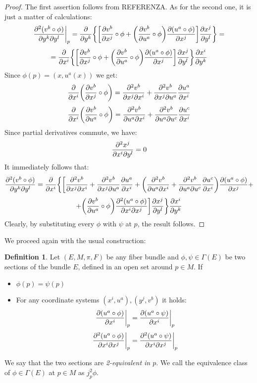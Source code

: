 \documentclass[12pt,a4paper]{report}
\theoremstyle{definition}
\newtheorem{Def}{Definition}[chapter]
\theoremstyle{Theorem}
\theoremstyle{definition}
\theoremstyle{definition}
\begin{document}
	\begin{proof}
		The first assertion follows from REFERENZA. As for the second one, it is just a matter of calculations:
		$${\partial^2(v^b\circ\phi) \over \partial{y^k}\partial{y^l}}\bigg|_p={\partial\over \partial y^k}\bigg\{\bigg[{\partial v^b\over \partial{x^j}}\circ \phi+\bigg({\partial v^b\over \partial{u^a}}\circ \phi\bigg) {\partial(u^a\circ \phi)\over \partial{x^j}}\bigg]{\partial x^j\over  \partial y^l}\bigg\}=$$
		$$={\partial\over \partial x^i}\bigg\{\bigg[{\partial v^b\over \partial{x^j}}\circ \phi+\bigg({\partial v^b\over \partial{u^a}}\circ \phi\bigg) {\partial(u^a\circ \phi)\over \partial{x^j}}\bigg]{\partial x^j\over  \partial y^l}\bigg\}{\partial x^i\over \partial y^k}$$
		Since $\phi(p)=(x,u^a(x))$ we get:
		$${\partial\over \partial x^i}\bigg({\partial v^b\over \partial{x^j}}\circ \phi\bigg)=
		{\partial^2 v^b\over \partial{x^j}\partial x^i}+{\partial^2 v^b\over \partial{x^j}\partial u^a}{\partial u^a\over \partial x^i}$$
		$${\partial\over \partial x^i}\bigg({\partial v^b\over \partial{u^a}}\circ \phi\bigg)=
		{\partial^2 v^b\over \partial{u^a}\partial x^i}+{\partial^2 v^b\over \partial{u^a}\partial u^c}{\partial u^c\over \partial x^i}$$
		Since partial derivatives commute, we have:
		$${\partial^2 x^j\over \partial x^i\partial y^l}=0$$
		It immediately follows that:
		$${\partial^2(v^b\circ\phi) \over \partial{y^k}\partial{y^l}}={\partial\over \partial x^i}\bigg\{\bigg[{\partial^2 v^b\over \partial{x^j}\partial x^i}+{\partial^2 v^b\over \partial{x^j}\partial u^a}{\partial u^a\over \partial x^i}+\bigg({\partial^2 v^b\over \partial{u^a}\partial x^i}+{\partial^2 v^b\over \partial{u^a}\partial u^c}{\partial u^c\over \partial x^i}\bigg){\partial(u^a\circ \phi)\over \partial{x^j}}+$$$$+\bigg({\partial v^b\over \partial{u^a}}\circ \phi\bigg) {\partial^2(u^a\circ \phi)\over \partial{x^i}\partial{x^j}}\bigg]{\partial x^j\over  \partial y^l}\bigg\}{\partial x^i\over \partial y^k}$$
		Clearly, by substituting every $\phi$ with $\psi$ at $p$, the result follows.
	\end{proof}
	We proceed again with the usual construction:
	\begin{Def}
		Let $(E,M,\pi,F)$ be any fiber bundle and $\phi,\psi\in\Gamma(E)$ be two sections of the bundle $E$, defined in an open set around $p\in M$. If
		\begin{itemize}
			\item $\phi(p)=\psi(p)$ 
			\item For any coordinate systems $(x^i,u^a),(y^j,v^b)$ it holds:
			$${\partial(u^a\circ\phi) \over \partial{x^i}}\bigg|_p={\partial(u^a\circ\psi) \over \partial{x^i}}\bigg|_p$$
			$${\partial^2(u^a\circ\phi) \over \partial{x^i}\partial{x^j}}\bigg|_p={\partial^2(u^a\circ\psi) \over \partial{x^i}\partial{x^j}}\bigg|_p$$
		\end{itemize} 
		We say that the two sections are \textit{2-equivalent in $p$}. We call the equivalence class of $\phi\in\Gamma(E)$ at $p\in M$ as $j_p^2\phi$.
	\end{Def}
\end{document}
